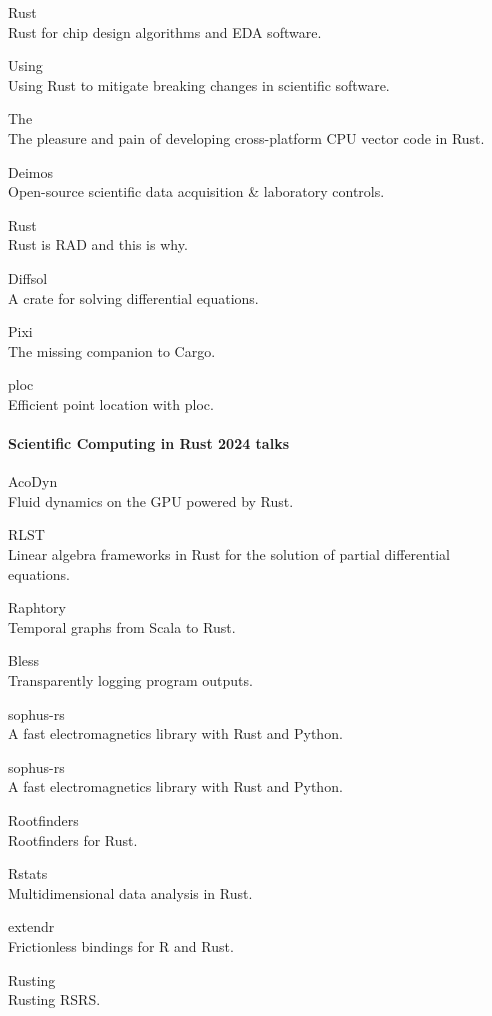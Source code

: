 \documentclass{article}
\begin{document}
Rust\\
Rust for chip design algorithms and EDA software.

Using\\
Using Rust to mitigate breaking changes in scientific software.

The\\
The pleasure and pain of developing cross-platform CPU vector code in Rust.

Deimos\\
Open-source scientific data acquisition \& laboratory controls.

Rust\\
Rust is RAD and this is why.

Diffsol\\
A crate for solving differential equations.

Pixi\\
The missing companion to Cargo.

ploc\\
Efficient point location with ploc.

\paragraph{Scientific Computing in Rust 2024 talks}

AcoDyn\\
Fluid dynamics on the GPU powered by Rust.

RLST\\
Linear algebra frameworks in Rust for the solution of partial differential equations.

Raphtory\\
Temporal graphs from Scala to Rust.

Bless\\
Transparently logging program outputs.

sophus-rs\\
A fast electromagnetics library with Rust and Python.

sophus-rs\\
A fast electromagnetics library with Rust and Python.

Rootfinders\\
Rootfinders for Rust.

Rstats\\
Multidimensional data analysis in Rust.

extendr\\
Frictionless bindings for R and Rust.

Rusting\\
Rusting RSRS.
\end{document}
